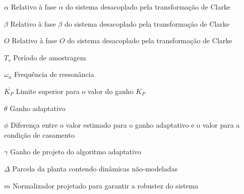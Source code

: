 \documentclass[12pt,openright,twoside,a4paper,english,french,spanish,
                sumario=tradicional,brazil]{abntex2}
\begin{document}
\begin{simbolos}
 \item[$ \alpha $] Relativo à fase $\alpha$ do sistema desacoplado pela transformação de Clarke
 \item[$ \beta $] Relativo à fase $\beta$ do sistema desacoplado pela transformação de Clarke
 \item[$ O $] Relativo à fase $O$ do sistema desacoplado pela transformação de Clarke
 \item[$ T_s $] Período de amostragem
 \item[$ \omega_n $] Frequência de ressonância
 \item[$ \overline{K_P} $] Limite superior para o valor do ganho $K_P$
 \item[$ \theta $] Ganho adaptativo
 \item[$ \phi $] Diferença entre o valor estimado para o ganho adaptativo e o valor para a condição de casamento
 \item[$ \gamma $] Ganho de projeto do algoritmo adaptativo
 \item[$ \Delta $] Parcela da planta contendo dinâmicas não-modeladas
 \item[$ m $] Normalizador projetado para garantir a robustez do sistema
\end{simbolos}

\tableofcontents*
\cleardoublepage



\textual





\end{document}
